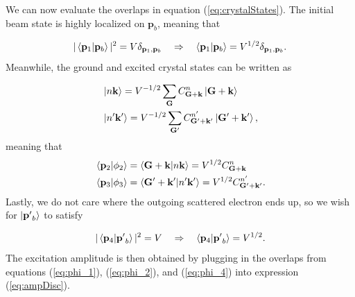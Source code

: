 \documentclass{article}
\begin{document}
We can now evaluate the overlaps in equation (\ref{eq:crystalStates}).
The initial beam state is highly localized on $\mathbf{p}_b$, meaning that

\begin{equation}
\label{eq:phi_1}
    |\bra{\mathbf{p}_1}\ket{\mathbf{p}_b}|^2 = V\delta_{\mathbf{p}_1,\mathbf{p}_b}
    \quad\Rightarrow\quad
    \bra{\mathbf{p}_1}\ket{\mathbf{p}_b} = V^{1/2}\delta_{\mathbf{p}_1,\mathbf{p}_b}.
\end{equation}
%
Meanwhile, the ground and excited crystal states can be written as

\begin{equation}
\begin{aligned}
&\ket{n\mathbf{k}}
=
V^{-1/2}\sum_{\mathbf{G}} C_{\mathbf{G+k}}^n \ket{\mathbf{G+k}}
\\&
\ket{n'\mathbf{k'}}
=
V^{-1/2}\sum_{\mathbf{G'}} C_{\mathbf{G'+k'}}^{n'} \ket{\mathbf{G'+k'}},
\end{aligned}
\end{equation}
%
meaning that
\begin{equation}
\label{eq:phi_2}
\begin{aligned}
    &\bra{\mathbf{p}_2}\ket{\phi_2}
    =
    \bra{\mathbf{G + k}}\ket{n\mathbf{k}}
    =
    V^{1/2}C^n_\mathbf{G+k}
    \\&
    \bra{\mathbf{p}_3}\ket{\phi_3}
    =
    \bra{\mathbf{G' + k'}}\ket{n'\mathbf{k'}}
    =
    V^{1/2}C^{n'}_\mathbf{G'+k'}.
\end{aligned}
\end{equation}
%
Lastly, we do not care where the outgoing scattered electron ends up, so we wish for $\ket{\mathbf{p'}_b}$ to satisfy

\begin{equation}
\label{eq:phi_4}
    |\bra{\mathbf{p}_4}\ket{\mathbf{p'}_b}|^2 = V
    \quad\Rightarrow\quad
    \bra{\mathbf{p}_4}\ket{\mathbf{p'}_b} = V^{1/2}.
\end{equation}
%
The excitation amplitude is then obtained by plugging in the overlaps from equations (\ref{eq:phi_1}), (\ref{eq:phi_2}), and (\ref{eq:phi_4}) into expression (\ref{eq:ampDisc}).
\end{document}
